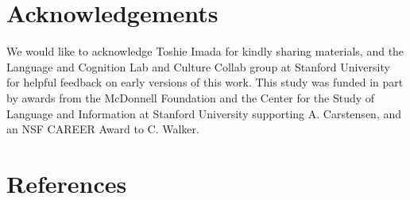 \documentclass[10pt, letterpaper]{article}
\begin{document}
\hypertarget{acknowledgements}{%
\section{Acknowledgements}\label{acknowledgements}}

We would like to acknowledge Toshie Imada for kindly sharing materials,
and the Language and Cognition Lab and Culture Collab group at Stanford
University for helpful feedback on early versions of this work. This
study was funded in part by awards from the McDonnell Foundation and the
Center for the Study of Language and Information at Stanford University
supporting A. Carstensen, and an NSF CAREER Award to C. Walker.

\hypertarget{references}{%
\section{References}\label{references}}

\setlength{\parindent}{-0.1in} 
\setlength{\leftskip}{0.125in}

\noindent
\end{document}
